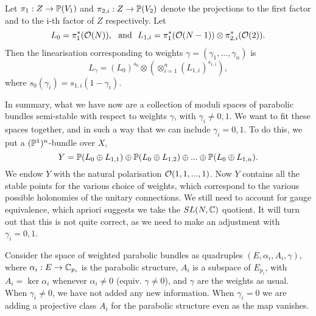 	
	Let $\pi_1:Z \to \mathbb{P}(V_1)$ and $\pi_{2,i}:Z\to \mathbb{P}(V_2)$ denote the projections to the first factor and to the i-th factor of $Z$ respectively. Let
	\begin{equation}
		L_0 = \pi_1^\ast(\mathcal{O}(N)),~ \text{ and } ~ L_{1,i} = \pi_1^\ast(\mathcal{O}(N-1))\otimes \pi_{2,i}^\ast (\mathcal{O}(2)).
	\end{equation}
	Then the linearisation corresponding to weights $\gamma = (\gamma_1,...,\gamma_n)$ is 
	\begin{equation}
		L_\gamma = (L_0)^{s_0} \otimes \left(
		\otimes_{i=1}^n (L_{1,i})^{s_{1,i}}
		\right),
	\end{equation}
	where $s_0(\gamma_i) = s_{1,i}(1-\gamma_i)$.
	
	In summary, what we have now are a collection of moduli spaces of parabolic bundles semi-stable with respect to weights $\gamma$, with $\gamma_i \neq 0,1$. We want to fit these spaces together, and in such a way that we can include $\gamma_i = 0,1$. To do this, we put a $(\mathbb{P}^1)^n$-bundle over $X$,
	\begin{equation}
		Y = \mathbb{P}(L_0\oplus L_{1,1})\oplus \mathbb{P}(L_0\oplus L_{1,2})\oplus ... \oplus \mathbb{P}(L_0\oplus L_{1,n}).
	\end{equation}
	We endow $Y$ with the natural polarisation $\mathcal{O}(1,1,...,1)$. Now $Y$ contains all the stable points for the various choice of weights, which correspond to the various possible holonomies of the unitary connections. We still need to account for gauge equivalence, which apriori suggests we take the $SL(N,\mathbb{C})$ quotient. It will turn out that this is not quite correct, as we need to make an adjustment with $\gamma_i = 0,1$.
	
	Consider the space of weighted parabolic bundles as quadruples $(E, \alpha_i, A_i, \gamma)$, where $\alpha_i:E\to \mathbb{C}_{p_i}$ is the parabolic structure, $A_i$ is a subspace of $E_{p_i}$, with $A_i = \ker\alpha_i$ whenever $\alpha_i \neq 0$ (equiv. $\gamma \neq 0$), and $\gamma$ are the weights as usual. When $\gamma_i \neq 0$, we have not added any new information. When $\gamma_i = 0$ we are adding a projective class $A_i$ for the parabolic structure even as the map vanishes.
	
